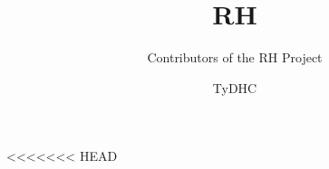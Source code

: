 \documentclass[a4paper]{report}
\title{RH}
\author{Contributors of the RH Project}
\author{TyDHC}
\begin{document}
\maketitle

<<<<<<< HEAD
\end{document}
